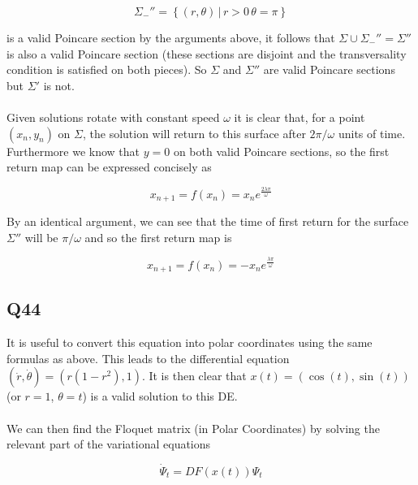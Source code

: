 \documentclass{article}
\begin{document}
\begin{equation*}
	\Sigma_-'' = \left\{(r,\theta) \, | \, r> 0 \, \theta = \pi \right\}
\end{equation*}

is a valid Poincare section by the arguments above, it follows that $\Sigma \cup \Sigma_-'' = \Sigma''$ 
is also a valid Poincare section (these sections are disjoint and the transversality condition is 
satisfied on both pieces). So $\Sigma$ and $\Sigma''$ are valid Poincare sections but $\Sigma'$ is not.

\paragraph{}
Given solutions rotate with constant speed $\omega$ it is clear that, for a point $(x_n,y_n)$ on 
$\Sigma$, the solution will return to this surface after $2\pi/\omega$ units of time. Furthermore 
we know that $y = 0$ on both valid Poincare sections, so the first return map can be expressed 
concisely as

\begin{equation*}
	x_{n+1} = f(x_n) = x_ne^{\frac{2\lambda\pi}{\omega}}
\end{equation*}

By an identical argument, we can see that the time of first return for the surface $\Sigma''$ will 
be $\pi/\omega$ and so the first return map is

\begin{equation*}
	x_{n+1} = f(x_n) = -x_ne^{\frac{\lambda\pi}{\omega}}
\end{equation*}

\subsection*{Q44}
It is useful to convert this equation into polar coordinates using the same formulas as above. 
This leads to the differential equation $(\dot r, \dot \theta) = (r(1 - r^2),1)$. It is then 
clear that $x(t) = (\cos(t),\sin(t))$ (or $r = 1$, $\theta = t$) is a valid solution to this DE. 

\paragraph{}
We can then find the Floquet matrix (in Polar Coordinates) by solving the relevant part of the 
variational equations

\begin{equation*}
	\dot \Psi_t = DF(x(t))\Psi_t
\end{equation*}
\end{document}
